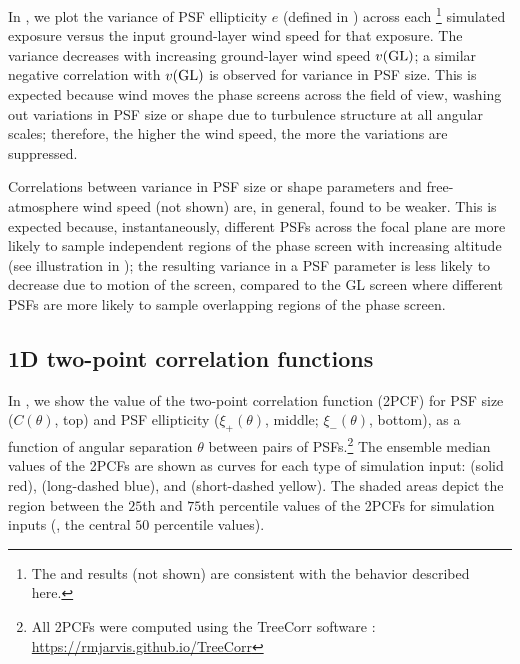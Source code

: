 \documentclass[twocolumn,twocolappendix]{openjournal}
\begin{document}
In , we plot the variance of PSF ellipticity $e$ (defined in ) across each \psfwssims\footnote{The \bench and \match results (not shown) are consistent with the \psfwssims behavior described here.} simulated exposure versus the input ground-layer wind speed for that exposure.
The variance decreases with increasing ground-layer wind speed $v({\rm GL})$; 
a similar negative correlation with $v({\rm GL})$ is observed for variance in PSF size.  
This is expected because wind moves the  phase screens across the field of view, washing out variations in PSF size or shape due to turbulence structure at all angular scales; therefore, the higher the wind speed, the more the variations are suppressed. 

Correlations between variance in PSF size or shape parameters and free-atmosphere wind speed (not shown) are, in general, found to be weaker. 
This is expected because, instantaneously, different PSFs across the focal plane are more likely to sample independent regions of the phase screen with increasing altitude (see illustration in ); 
the resulting variance in a PSF parameter is less likely to decrease due to motion of the screen, compared to the GL screen where different PSFs are more likely to sample overlapping regions of the phase screen.  

\subsection{1D two-point correlation functions}
\label{sec:covariances}
In , we show the value of the two-point correlation function (2PCF) for PSF size ($C(\theta)$, top) and PSF ellipticity ($\xi_+(\theta)$, middle; $\xi_-(\theta)$, bottom), as a function of angular separation $\theta$ between pairs of PSFs.\footnote{All 2PCFs were computed using the TreeCorr software \citep{jarvis_skewness_2004}: \url{https://rmjarvis.github.io/TreeCorr}}  
The ensemble median values of the 2PCFs are shown as curves for each type of simulation input: \psfwssims (solid red), \bench (long-dashed blue), and \match (short-dashed yellow).
The shaded areas depict the region between the $25$th and $75$th percentile values of the 2PCFs for \psfwssims simulation inputs (\ie, the central $50$ percentile values).
\end{document}
